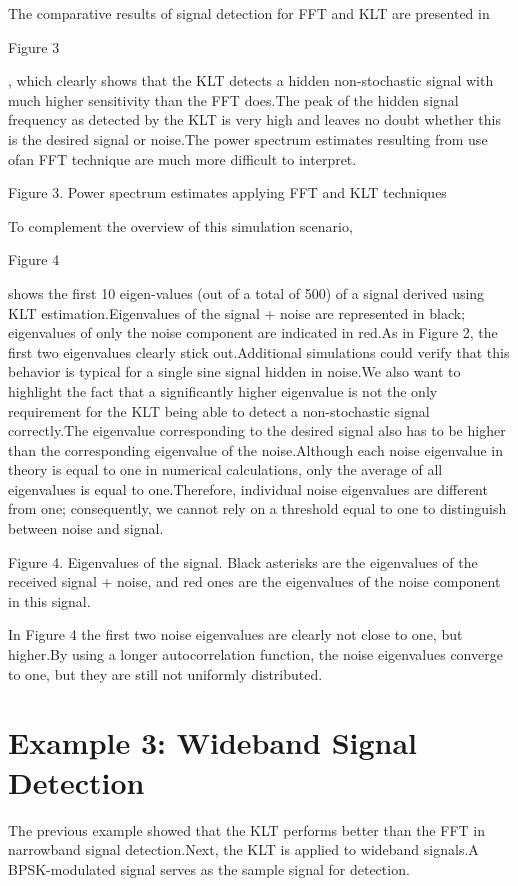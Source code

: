 \documentclass[12pt]{report}
\begin{document}
The comparative results of signal detection for FFT and KLT are presented in \begin{normalsize}\color{red}Figure 3\end{normalsize}, which clearly shows that the KLT detects a hidden non-stochastic signal with much higher sensitivity than the FFT does.\@ The peak of the hidden signal frequency as detected by the KLT is very high and leaves no doubt whether this is the desired signal or noise.\@ The power spectrum estimates resulting from use ofan FFT technique are much more difficult to interpret.
\begin{center}
	\color{blue}Figure 3. Power spectrum estimates applying FFT and KLT techniques
\end{center}
To complement the overview of this simulation scenario, \begin{normalsize}\color{red}Figure 4\end{normalsize} shows the first 10 eigen-values (out of a total of 500) of a signal derived using KLT estimation.\@ Eigenvalues of the signal + noise are represented in black; eigenvalues of only the noise component are indicated in red.\@ As in Figure 2, the first two eigenvalues clearly stick out.\@ Additional simulations could verify that this behavior is typical for a single sine signal hidden in noise.We also want to highlight the fact that a significantly higher eigenvalue is not the only requirement for the KLT being able to detect a non-stochastic signal correctly.\@ The eigenvalue corresponding to the desired signal also has to be higher than the corresponding eigenvalue of the noise.\@ Although each noise eigenvalue in theory is equal to one in numerical calculations, only the average of all eigenvalues is equal to one.\@ Therefore, individual noise eigenvalues are different from one; consequently, we cannot rely on a threshold equal to one to distinguish between noise and signal.
\begin{center}
	\color{blue} Figure 4. Eigenvalues of the signal. Black asterisks are the eigenvalues of the received signal + noise, and red ones are the eigenvalues of the noise component in this signal.
\end{center}
In Figure 4 the first two noise eigenvalues are clearly not close to one, but higher.\@ By using a longer autocorrelation function, the noise eigenvalues converge to one, but they are still not
uniformly distributed.
\section*{Example 3: Wideband Signal Detection}
The previous example showed that the KLT performs better than the FFT in narrowband signal detection.\@ Next, the KLT is applied to wideband signals.\@ A BPSK-modulated signal serves as the sample signal for detection.
\end{document}
